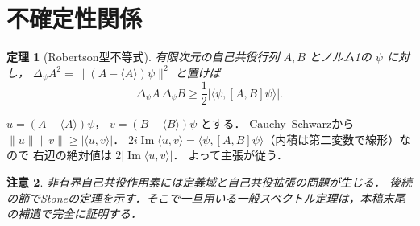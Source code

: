 \documentclass[a5paper,10pt,onecolumn]{jsarticle}
\makeatletter
\theoremstyle{mathnotetheorem}
\newtheorem{theorem}{定理}[section]
\newtheorem{remark}[theorem]{注意}
\renewcommand{\proofname}{証明}
\renewenvironment{proof}[1][\proofname]{%
  \par\pushQED{\qed}\normalfont\topsep4\p@\@plus2\p@\relax
  \trivlist\item[\hskip\labelsep\bfseries #1]\ignorespaces
}{\popQED\endtrivlist\@endpefalse}
\newcommand{\norm}[1]{\lVert #1\rVert}
\makeatother
\begin{document}
\section{不確定性関係}
\begin{theorem}[Robertson型不等式]
有限次元の自己共役行列 $A,B$ とノルム1の $\psi$ に対し，
$\Delta_\psi A^2=\norm{(A-\langle A\rangle)\psi}^2$ と置けば
\[
 \Delta_\psi A\,\Delta_\psi B
 \ge\frac12|\langle\psi,[A,B]\psi\rangle|.
\]
\end{theorem}
\begin{proof}
$u=(A-\langle A\rangle)\psi$，
$v=(B-\langle B\rangle)\psi$ とする．
Cauchy--Schwarzから $\norm u\norm v\ge|\langle u,v\rangle|$．
$2i\operatorname{Im}\langle u,v\rangle
=\langle\psi,[A,B]\psi\rangle$（内積は第二変数で線形）なので
右辺の絶対値は $2|\operatorname{Im}\langle u,v\rangle|$．
よって主張が従う．
\end{proof}
\begin{remark}
非有界自己共役作用素には定義域と自己共役拡張の問題が生じる．
後続の節でStoneの定理を示す．そこで一旦用いる一般スペクトル定理は，本稿末尾の補遺で完全に証明する．
\end{remark}
\end{document}
